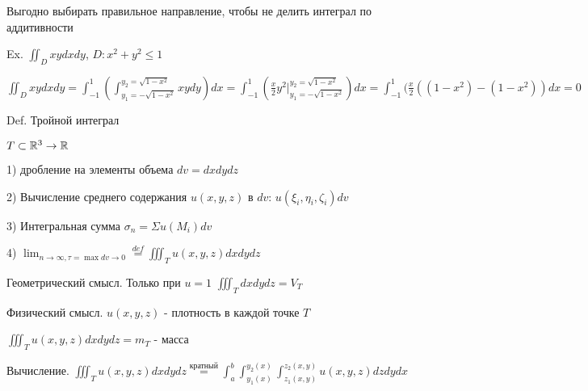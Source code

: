 \documentclass[12pt]{article}
\begin{document}
    Выгодно выбирать правильное направление, чтобы не делить интеграл по аддитивности

    Ex. $\iint_D xy dx dy$, $D : x^2 + y^2 \leq 1$

    $\iint_D xy dx dy = \int_{-1}^1 (\int_{y_1 = -\sqrt{1-x^2}}^{y_2 = \sqrt{1-x^2}} xy dy) dx = \int_{-1}^1 (\frac{x}{2} y^2 \Big|_{y_1 = -\sqrt{1-x^2}}^{y_2 = \sqrt{1-x^2}}) dx =
    \int_{-1}^1 (\frac{x}{2} ((1 - x^2) - (1 - x^2)) dx = 0$

    Def. Тройной интеграл

    $T \subset \mathbb{R}^3 \rightarrow \mathbb{R}$

    1) дробление на элементы объема $dv = dxdydz$

    2) Вычисление среднего содержания $u(x, y, z)$ в $dv$: $u(\xi_i, \eta_i, \zeta_i) dv$

    3) Интегральная сумма $\sigma_n = \Sigma u(M_i) dv$

    4) $\lim_{n \to \infty, \tau = \max dv \to 0} \stackrel{def}{=} \iiint_T u(x, y, z) dxdydz$

    Геометрический смысл. Только при $u = 1$ $\iiint_T dxdydz = V_T$

    Физический смысл. $u(x, y, z)$ - плотность в каждой точке $T$

    $\iiint_T u(x, y, z) dxdydz = m_T$ - масса

    Вычисление. $\iiint_T u(x, y, z) dxdydz \stackrel{\text{кратный}}{=} \int^b_a \int_{y_1(x)}^{y_2(x)} \int_{z_1(x, y)}^{z_2(x, y)} u(x, y, z) dz dy dx$
\end{document}
